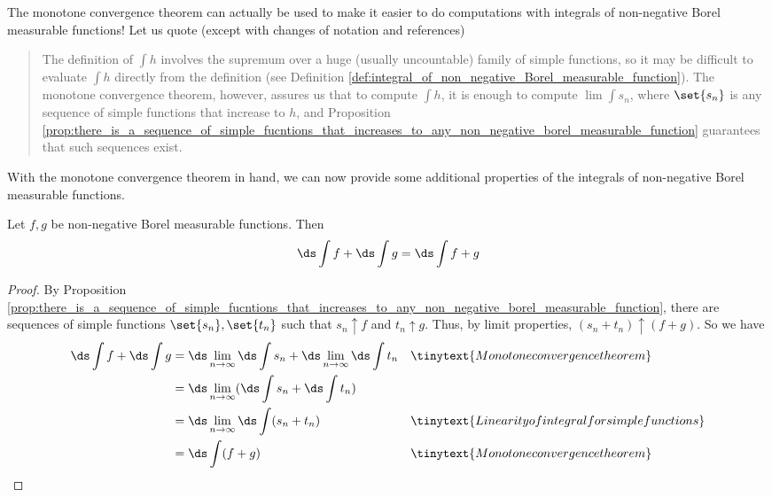 \documentclass{article} %
\begin{document}
The monotone convergence theorem can actually be used to make it easier to do computations with integrals of non-negative Borel measurable functions!  Let us quote \cite{folland1999real} (except with changes of notation and references)

\begin{quotation}
 The definition of $\int h$  involves the supremum over a huge (usually uncountable) family of simple functions, so it may be difficult to evaluate $\int h$ directly from the definition (see Definition \ref{def:integral_of_non_negative_Borel_measurable_function}).  The monotone convergence theorem, however, assures us that to compute $\int h$, it is enough to compute $\lim \int s_n$, where $\set{s_n}$ is any sequence of simple functions that increase to $h$, and Proposition \ref{prop:there_is_a_sequence_of_simple_fucntions_that_increases_to_any_non_negative_borel_measurable_function} guarantees that such sequences exist. 
\end{quotation}



With the monotone convergence theorem in hand, we can now provide some additional properties of the integrals of non-negative Borel measurable functions.

\begin{proposition}
Let $f, g$ be non-negative Borel measurable functions. Then
\[ \ds\int f + \ds\int g = \ds\int f+g \]
\label{prop:additivity_of_integral_for_non_negative_Borel_measurable_functions}	
\end{proposition}

\begin{proof}
By Proposition \ref{prop:there_is_a_sequence_of_simple_fucntions_that_increases_to_any_non_negative_borel_measurable_function}, there are sequences of simple functions $\set{s_n}, \set{t_n}$ such that $s_n \uparrow f$ and $t_n \uparrow g$.   Thus, by limit properties, $(s_n + t_n) \uparrow (f+g)$.  So we have
\begin{align*}
	\ds\int f + \ds\int g &=\ds\lim_{n \to \infty} \ds\int s_n + \ds\lim_{n \to \infty} \ds\int t_n && \tinytext{Monotone convergence theorem} \\
	&= \ds\lim_{n \to \infty} ( \ds\int s_n +  \ds\int t_n ) \\
	&=  \ds\lim_{n \to \infty} \ds\int (s_n + t_n)  && \tinytext{Linearity of integral for simple functions}\\
	&= \ds\int (f+g)  && \tinytext{Monotone convergence theorem}
 \end{align*}
\end{proof}
\end{document}
